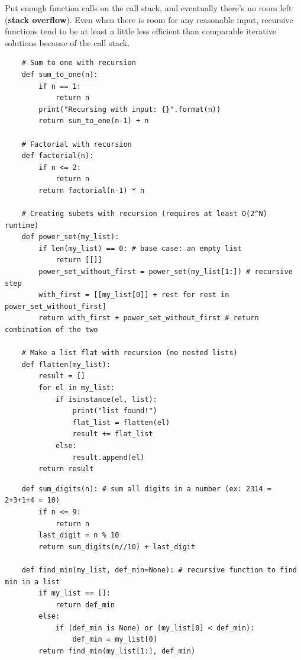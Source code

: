 \documentclass[11pt, a4paper]{article}
\begin{document}
\begin{spacing}{1.1}
	Put enough function calls on the call stack, and eventually there’s no room left (\textbf{stack overflow}).	Even when there is room for any reasonable input, recursive functions tend to be at least a little less efficient than comparable iterative solutions because of the call stack. \\
	\begin{lstlisting}
	# Sum to one with recursion
	def sum_to_one(n):
		if n == 1:
			return n
		print("Recursing with input: {}".format(n))
		return sum_to_one(n-1) + n 
	
	# Factorial with recursion
	def factorial(n):
		if n <= 2:
			return n
		return factorial(n-1) * n
		
	# Creating subets with recursion (requires at least O(2^N) runtime)
	def power_set(my_list):
		if len(my_list) == 0: # base case: an empty list
			return [[]]
		power_set_without_first = power_set(my_list[1:]) # recursive step
		with_first = [[my_list[0]] + rest for rest in power_set_without_first]
		return with_first + power_set_without_first # return combination of the two
		
	# Make a list flat with recursion (no nested lists)	
	def flatten(my_list):
		result = []
		for el in my_list:
			if isinstance(el, list):
				print("list found!")
				flat_list = flatten(el)
				result += flat_list
			else:
				result.append(el)
		return result	\end{lstlisting} \newpage
	\begin{lstlisting}
	def sum_digits(n): # sum all digits in a number (ex: 2314 = 2+3+1+4 = 10)
		if n <= 9:
			return n
		last_digit = n % 10
		return sum_digits(n//10) + last_digit
		
	def find_min(my_list, def_min=None): # recursive function to find min in a list
		if my_list == []:
			return def_min
		else:
			if (def_min is None) or (my_list[0] < def_min):
				def_min = my_list[0]
		return find_min(my_list[1:], def_min) 
		

\end{lstlisting}
\end{spacing}
\end{document}
